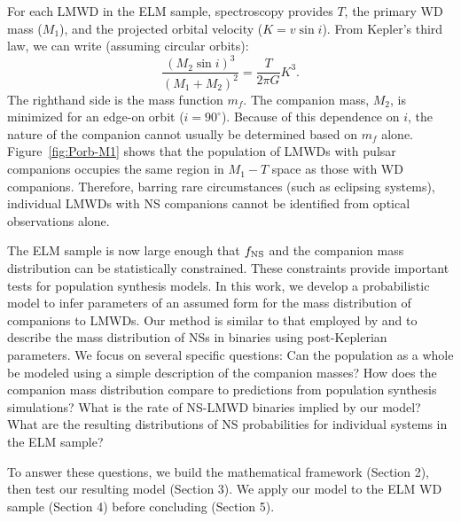 \documentclass[apjl]{emulateapj}
\newcommand{\degree}{^{\circ}}
\newcommand{\period}{T}
\newcommand{\mf}{m_f}
\begin{document}
For each LMWD in the ELM sample, spectroscopy provides $\period$, the primary WD mass ($M_1$), and the projected orbital velocity ($K=v \sin i$). From Kepler's third law, we can write (assuming circular orbits):
\begin{equation}
	\frac{(M_2 \sin i)^3}{\left(M_1+M_2\right)^2} = \frac{\period}{2\pi G} K^3. \label{eq:massfunc}
\end{equation}
The righthand side is the mass function $\mf$. The companion mass, $M_2$, is minimized for an edge-on orbit ($i = 90\degree$). Because of this dependence on $i$, the nature of the companion cannot usually be determined based on $\mf$ alone. Figure~\ref{fig:Porb-M1} shows that the population of LMWDs with pulsar companions occupies the same region in $M_1 - \period$ space as those with WD companions. Therefore, barring rare circumstances (such as eclipsing systems), individual LMWDs with NS companions cannot be identified from optical observations alone.



The ELM sample is now large enough that $f_{\rm NS}$ and the companion mass distribution can be statistically constrained. These constraints provide important tests for population synthesis models.
In this work, we develop a probabilistic model to infer parameters of an assumed form for the mass distribution of companions to LMWDs. Our method is similar to that employed by \citet{ozel12} and \citet{kiziltan13} to describe the mass distribution of NSs in binaries using post-Keplerian parameters. We focus on several specific questions: Can the population as a whole be modeled using a simple description of the companion masses? How does the companion mass distribution compare to predictions from population synthesis simulations?  What is the rate of NS-LMWD binaries implied by our model? What are the resulting distributions of NS probabilities for individual systems in the ELM sample? 


To answer these questions, we build the mathematical framework (Section 2), then test our resulting model (Section 3). We apply our model to the ELM WD sample (Section 4) before concluding (Section 5).
\end{document}
